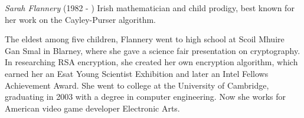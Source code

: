 \documentclass[12pt]{article}
\begin{document}
\emph{Sarah Flannery} (1982 - ) Irish mathematician and child prodigy, best known for her work on the Cayley-Purser algorithm.

The eldest among five children, Flannery went to high school at Scoil Mhuire Gan Smal in Blarney, where she gave a science fair presentation on cryptography. In researching RSA encryption, she created her own encryption algorithm, which earned her an Esat Young Scientist Exhibition and later an Intel Fellows Achievement Award. She went to college at the University of Cambridge, graduating in 2003 with a degree in computer engineering. Now she works for American video game developer Electronic Arts.
\end{document}
